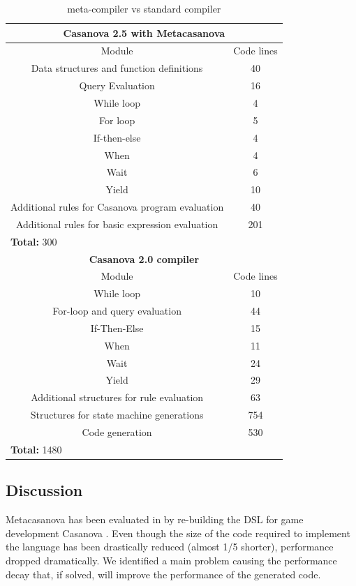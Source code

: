 \begin{table}[!h]
	\centering
	\tiny
	\begin{tabular}{|c|c|}
		\hline
		\multicolumn{2}{|c|}{\textbf{Casanova 2.5 with Metacasanova}} \\
		\hline
		Module & Code lines \\
		\hline
		Data structures and function definitions & 40 \\
		\hline
		Query Evaluation & 16 \\
		\hline
		While loop & 4 \\
		\hline
		For loop & 5 \\
		\hline
		If-then-else & 4 \\
		\hline
		When & 4 \\
		\hline
		Wait & 6 \\
		\hline
		Yield & 10 \\
		\hline
		Additional rules for Casanova program evaluation & 40 \\
		\hline
		Additional rules for basic expression evaluation & 201 \\
		\hline
		\multicolumn{2}{|l|}{\textbf{Total: } 300} \\
		\hline
		\multicolumn{2}{|c|}{\textbf{Casanova 2.0 compiler}} \\
		\hline
		Module & Code lines \\
		\hline
		While loop & 10 \\
		\hline
		For-loop and query evaluation & 44 \\
		\hline
		If-Then-Else & 15 \\
		\hline
		When & 11 \\
		\hline
		Wait & 24 \\
		\hline
		Yield & 29 \\
		\hline
		Additional structures for rule evaluation & 63 \\
		\hline
		Structures for state machine generations & 754 \\
		\hline
		Code generation & 530 \\
		\hline
		\multicolumn{2}{|l|}{\textbf{Total: } 1480} \\
		\hline			
	\end{tabular}	
	\caption{meta-compiler vs standard compiler}
	\label{tab:compiler_comparison}
\end{table}

\subsection{Discussion}
\label{subsec:code_generation_discussion}
Metacasanova has been evaluated in \cite{DiGiacomo2017} by re-building the DSL for game development Casanova \cite{abbadi2015casanova, abbadithesis2017}. Even though the size of the code required to implement the language has been drastically reduced (almost 1/5 shorter), performance dropped dramatically. We identified a main problem causing the performance decay that, if solved, will improve the performance of the generated code.

